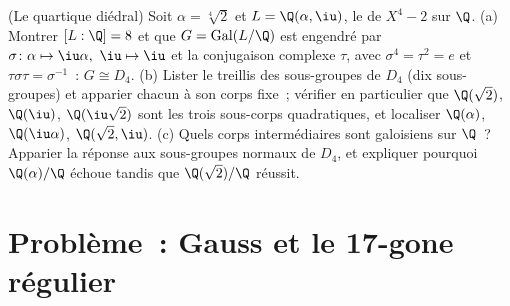 \begin{exercise}[$\star\star\star$]\label{exo:b3:galois:12}
(Le quartique diédral) Soit $\alpha = \sqrt[4]2$ et $L =
\Q(\alpha, \iu)$, le  de $X^4 - 2$ sur
$\Q$.
(a) Montrer $[L : \Q] = 8$ et que $G =
\operatorname{Gal}(L/\Q)$ est engendré par $\sigma\colon
\alpha \mapsto \iu\alpha,\ \iu \mapsto \iu$ et la conjugaison
complexe $\tau$, avec $\sigma^4 = \tau^2 = e$ et
$\tau\sigma\tau = \sigma^{-1}$~: $G \cong D_4$.
(b) Lister le treillis des sous-groupes de $D_4$ (dix
sous-groupes) et apparier chacun à son corps fixe~; vérifier
en particulier que $\Q(\sqrt2)$, $\Q(\iu)$, $\Q(\iu\sqrt2)$
sont les trois sous-corps quadratiques, et localiser
$\Q(\alpha)$, $\Q(\iu\alpha)$, $\Q(\sqrt2, \iu)$.
(c) Quels corps intermédiaires sont galoisiens sur $\Q$~?
Apparier la réponse aux sous-groupes normaux de $D_4$, et
expliquer pourquoi $\Q(\alpha)/\Q$ échoue tandis que
$\Q(\sqrt2)/\Q$ réussit.
\end{exercise}

\section{Problème~: Gauss et le 17-gone régulier}

